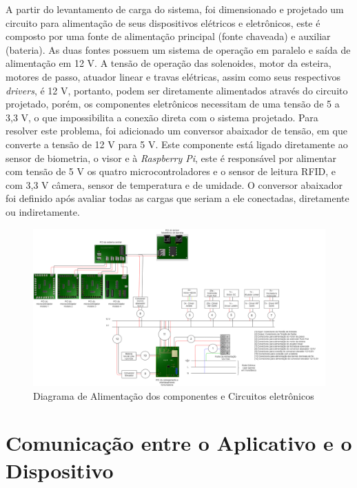 A partir do levantamento de carga do sistema, foi dimensionado e projetado um circuito para alimentação de seus dispositivos elétricos e eletrônicos, este é composto por uma fonte de alimentação principal (fonte chaveada) e auxiliar (bateria). As duas fontes possuem um sistema de operação em paralelo e saída de alimentação em 12 V. A tensão de operação das solenoides, motor da esteira, motores de passo, atuador linear e travas elétricas, assim como seus respectivos \textit{drivers}, é 12 V, portanto, podem ser diretamente alimentados através do circuito projetado, porém, os componentes eletrônicos necessitam de uma tensão de 5 a 3,3 V, o que impossibilita a conexão direta com o sistema projetado. Para resolver este problema, foi adicionado um conversor abaixador de tensão, em que converte a tensão de 12 V para 5 V. Este componente está ligado diretamente ao sensor de biometria, o visor e à \textit{Raspberry Pi}, este é responsável por alimentar com tensão de 5 V os quatro microcontroladores e o sensor de leitura RFID, e com 3,3 V câmera, sensor de temperatura e de umidade. O conversor abaixador foi definido após avaliar todas as cargas que seriam a ele conectadas, diretamente ou indiretamente. 
\hspace{2cm}    
\begin{figure}[H]
        \centering
        \hspace{-2cm}
        \includegraphics[width=1.1\textwidth]{figuras/integracao/integracao_energia_eletronica.png} 
        \caption{Diagrama de Alimentação dos componentes e Circuitos eletrônicos}
        \label{fig:integracao_eletrônica_energia}
    \end{figure}
    
    
\section{Comunicação entre o Aplicativo e o Dispositivo}
\label{app_dispositivo}

